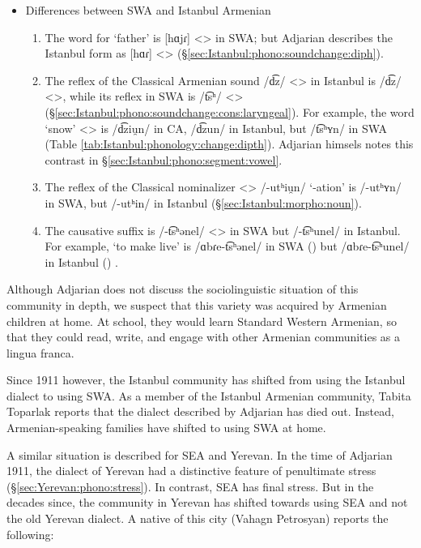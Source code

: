 \begin{itemize}
	\item Differences between SWA and Istanbul Armenian
	\begin{enumerate}
		\item The word for `father' is [hɑjɾ] <> in SWA; but Adjarian describes the Istanbul form as [hɑɾ] <> (\S\ref{sec:Istanbul:phono:soundchange:diph}).
		\item The reflex of the Classical Armenian sound /d͡z/ <> in Istanbul is /d͡z/ <>, while its reflex in SWA is /t͡sʰ/ <> (\S\ref{sec:Istanbul:phono:soundchange:cons:laryngeal}). For example, the word `snow' <> is /d͡ziu̯n/ in CA, /d͡zun/ in Istanbul, but /t͡sʰʏn/ in SWA (Table \ref{tab:Istanbul:phonology:change:dipth}). Adjarian himsels notes this contrast in \S\ref{sec:Istanbul:phono:segment:vowel}. 
		\item The reflex of the Classical nominalizer <> /-utʰiu̯n/ `-ation' is /-utʰʏn/ in SWA, but /-utʰin/ in Istanbul (\S\ref{sec:Istanbul:morpho:noun}). 
		\item The causative suffix is /-t͡sʰənel/ <> in SWA but /-t͡sʰunel/ in Istanbul. For example, `to make live' is /ɑbɾe-t͡sʰənel/ in SWA () but /ɑbɾe-t͡sʰunel/ in Istanbul () \citep[140]{Adjarian-1941-IstanbulDialect}. 
	\end{enumerate}
\end{itemize}






Although Adjarian does not discuss the sociolinguistic situation of this community in depth, we suspect that this variety was acquired by Armenian children at home. At school, they would learn Standard Western Armenian, so that they could read, write, and engage with other Armenian communities as a lingua franca. 

Since 1911 however, the Istanbul community has shifted from using the Istanbul dialect to using SWA. As a member of the Istanbul Armenian community, Tabita Toparlak reports that the dialect described by Adjarian has died out. Instead, Armenian-speaking families have shifted to using SWA at home. 




A similar situation is described for SEA and Yerevan. In the time of Adjarian 1911, the dialect of Yerevan had a distinctive feature of penultimate stress (\S\ref{sec:Yerevan:phono:stress}). In contrast, SEA has final stress. But in the decades since, the community in Yerevan has shifted towards using SEA and not the old Yerevan dialect. A native of this city (Vahagn Petrosyan) reports the following:

